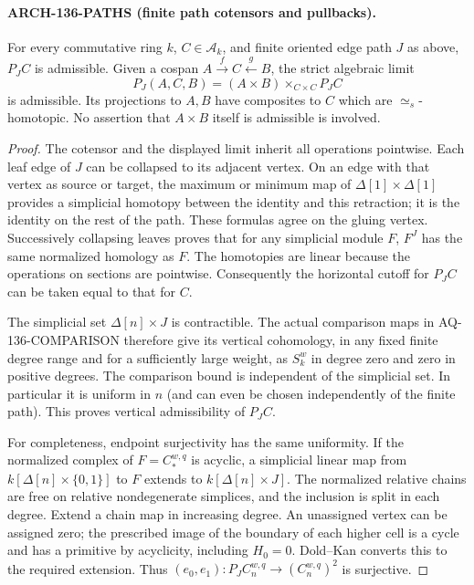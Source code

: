 \paragraph{ARCH-136-PATHS (finite path cotensors and pullbacks).}
For every commutative ring $k$, $C\in\mathcal A_k$, and finite oriented
edge path $J$ as above, $P_J C$ is admissible.  Given a cospan
$A\xrightarrow{f} C\xleftarrow{g}B$, the strict algebraic limit
\[
 P_J(A,C,B)=(A\times B)\mathbin{\times}_{C\times C}P_J C
\]
is admissible.  Its projections to $A,B$ have composites to $C$
which are $\simeq_s$-homotopic.  No assertion that $A\times B$ itself
is admissible is involved.

\begin{proof}
The cotensor and the displayed limit inherit all operations pointwise.
Each leaf edge of $J$ can be collapsed to its adjacent vertex.  On an
edge with that vertex as source or target, the maximum or minimum map
of $\Delta[1]\times\Delta[1]$ provides a simplicial homotopy between
the identity and this retraction; it is the identity on the rest of
the path.  These formulas agree on the gluing vertex.  Successively
collapsing leaves proves that for any simplicial module $F$, $F^J$
has the same normalized homology as $F$.  The homotopies are linear
because the operations on sections are pointwise.  Consequently the
horizontal cutoff for $P_J C$ can be taken equal to that for $C$.

The simplicial set $\Delta[n]\times J$ is contractible.  The actual
comparison maps in AQ-136-COMPARISON therefore give its vertical
cohomology, in any fixed finite degree range and for a sufficiently
large weight, as $S_k^w$ in degree zero and zero in positive degrees.
The comparison bound is independent of the simplicial set.  In
particular it is uniform in $n$ (and can even be chosen independently
of the finite path).  This proves vertical admissibility of $P_J C$.

For completeness, endpoint surjectivity has the same uniformity.
If the normalized complex of $F=C_*^{w,q}$ is acyclic, a simplicial
linear map from
$k[\Delta[n]\times\{0,1\}]$ to $F$ extends to
$k[\Delta[n]\times J]$.  The normalized relative chains are free
on relative nondegenerate simplices, and the inclusion is split in
each degree.  Extend a chain map in increasing degree.  An unassigned
vertex can be assigned zero; the prescribed image of the boundary
of each higher cell is a cycle and has a primitive by acyclicity,
including $H_0=0$.  Dold--Kan converts this to the required extension.
Thus $(e_0,e_1):P_J C_n^{w,q}\to(C_n^{w,q})^2$ is surjective.


\end{proof}
